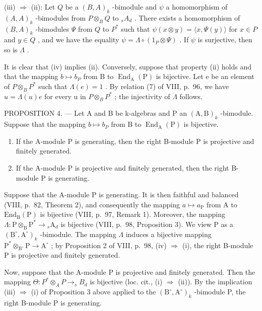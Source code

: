 (iii) \(\Rightarrow\) (ii): Let \(Q\) be a \((B,A)_k\) -bimodule and \(\psi\) a homomorphism of \((A,A)_k\) -bimodules from \(P \otimes_B Q\) to \({}_s A_d\) . There exists a homomorphism of \((B,A)_k\) -bimodules \(\Psi\) from \(Q\) to \(P^*\) such that \(\psi(x \otimes y) = \langle x, \Psi(y) \rangle\) for \(x \in P\) and \(y \in Q\) , and we have the equality \(\psi = \Lambda \circ (1_P \otimes \Psi)\) . If \(\psi\) is surjective, then so is \(\Lambda\) .

It is clear that (iv) implies (ii). Conversely, suppose that property (ii) holds and that the mapping \(b \mapsto b_{P}\) from B to \(\operatorname{End}_{\mathrm{A}}(\mathrm{P})\) is bijective. Let e be an element of \(P \otimes_{B} P^{*}\) such that \(\Lambda(e) = 1\) . By relation (7) of VIII, p.~96, we have \(u = \Lambda(u)e\) for every u in \(P \otimes_{B} P^{*}\) ; the injectivity of \(\Lambda\) follows.

PROPOSITION 4. --- Let A and B be k-algebras and P an \((\mathrm{A},\mathrm{B})_{k}\) -bimodule. Suppose that the mapping \(b\mapsto b_{P}\) from B to \(\operatorname{End}_{\mathrm{A}}(\mathrm{P})\) is bijective.

\begin{enumerate}
\def\labelenumi{\alph{enumi})}
\item
  If the A-module P is generating, then the right B-module P is projective and finitely generated.
\item
  If the A-module P is projective and finitely generated, then the right B-module P is generating.
\end{enumerate}

Suppose that the A-module P is generating. It is then faithful and balanced (VIII, p.~82, Theorem 2), and consequently the mapping \(a \mapsto a_{\mathrm{P}}\) from A to \(\mathrm{End}_{\mathrm{B}}(\mathrm{P})\) is bijective (VIII, p.~97, Remark 1). Moreover, the mapping \(\Lambda : \mathrm{P} \otimes_{\mathrm{B}} \mathrm{P}^{*} \to {}_{s} \mathrm{A}_{d}\) is bijective (VIII, p.~98, Proposition 3). We view P as a \((\mathrm{B}^{\circ}, \mathrm{A}^{\circ})_{k}\) -bimodule. The mapping \(\Lambda\) induces a bijective mapping \(\mathrm{P}^{*} \otimes_{\mathrm{B}^{\circ}} \mathrm{P} \to \mathrm{A}^{\circ}\) ; by Proposition 2 of VIII, p.~98, (iv) \(\Rightarrow\) (i), the right B-module P is projective and finitely generated.

Now, suppose that the A-module P is projective and finitely generated. Then the mapping \(\Theta: P^{*} \otimes_{A} P \to_{s} B_{d}\) is bijective (loc. cit., (i) \(\Rightarrow\) (ii)). By the implication (iii) \(\Rightarrow\) (i) of Proposition 3 above applied to the \((\mathrm{B}^{\circ}, \mathrm{A}^{\circ})_{k}\) -bimodule P, the right B-module P is generating.

